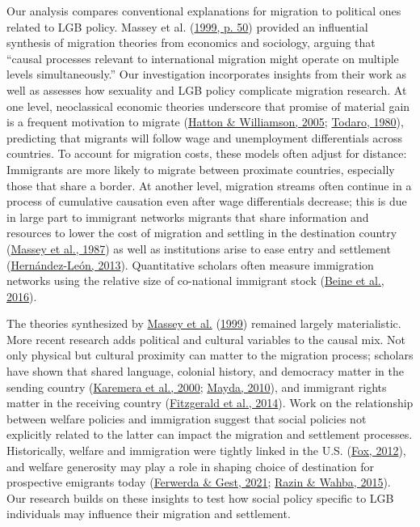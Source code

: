 \documentclass[
  11pt,
]{article}
\begin{document}
Our analysis compares conventional explanations for migration to political ones related to LGB policy. Massey et al. (\protect\hyperlink{ref-massey_1999}{1999, p. 50}) provided an influential synthesis of migration theories from economics and sociology, arguing that ``causal processes relevant to international migration might operate on multiple levels simultaneously.'' Our investigation incorporates insights from their work as well as assesses how sexuality and LGB policy complicate migration research. At one level, neoclassical economic theories underscore that promise of material gain is a frequent motivation to migrate (\protect\hyperlink{ref-hatton_2005a}{Hatton \& Williamson, 2005}; \protect\hyperlink{ref-todaro_1980}{Todaro, 1980}), predicting that migrants will follow wage and unemployment differentials across countries. To account for migration costs, these models often adjust for distance: Immigrants are more likely to migrate between proximate countries, especially those that share a border. At another level, migration streams often continue in a process of cumulative causation even after wage differentials decrease; this is due in large part to immigrant networks migrants that share information and resources to lower the cost of migration and settling in the destination country (\protect\hyperlink{ref-massey_1987}{Massey et al., 1987}) as well as institutions arise to ease entry and settlement (\protect\hyperlink{ref-hernandez-leon_2013}{Hernández-León, 2013}). Quantitative scholars often measure immigration networks using the relative size of co-national immigrant stock (\protect\hyperlink{ref-beine_2016}{Beine et al., 2016}).

The theories synthesized by \protect\hyperlink{ref-massey_1999}{Massey et al.} (\protect\hyperlink{ref-massey_1999}{1999}) remained largely materialistic. More recent research adds political and cultural variables to the causal mix. Not only physical but cultural proximity can matter to the migration process; scholars have shown that shared language, colonial history, and democracy matter in the sending country (\protect\hyperlink{ref-karemera_2000}{Karemera et al., 2000}; \protect\hyperlink{ref-mayda_2010}{Mayda, 2010}), and immigrant rights matter in the receiving country (\protect\hyperlink{ref-fitzgerald_2014}{Fitzgerald et al., 2014}). Work on the relationship between welfare policies and immigration suggest that social policies not explicitly related to the latter can impact the migration and settlement processes. Historically, welfare and immigration were tightly linked in the U.S. (\protect\hyperlink{ref-fox_2012}{Fox, 2012}), and welfare generosity may play a role in shaping choice of destination for prospective emigrants today (\protect\hyperlink{ref-ferwerda_2021_pull}{Ferwerda \& Gest, 2021}; \protect\hyperlink{ref-razin_2015}{Razin \& Wahba, 2015}). Our research builds on these insights to test how social policy specific to LGB individuals may influence their migration and settlement.
\end{document}
